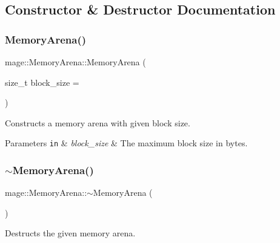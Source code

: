 \subsection{Constructor \& Destructor Documentation}
\hypertarget{classmage_1_1_memory_arena_ac90beb8cf8dc42944a0fd6a4a9e8355c}{}\label{classmage_1_1_memory_arena_ac90beb8cf8dc42944a0fd6a4a9e8355c} 
\subsubsection{\texorpdfstring{Memory\+Arena()}{MemoryArena()}\hspace{0.1cm}{\footnotesize\ttfamily [1/3]}}
{\footnotesize\ttfamily mage\+::\+Memory\+Arena\+::\+Memory\+Arena (\begin{DoxyParamCaption}\item[{size\+\_\+t}]{block\+\_\+size = {} }\end{DoxyParamCaption})}

Constructs a memory arena with given block size.


\begin{DoxyParams}[1]{Parameters}
\mbox{\tt in}  & {\em block\+\_\+size} & The maximum block size in bytes. \\
\hline
\end{DoxyParams}
\hypertarget{classmage_1_1_memory_arena_acfee6fc205e2eaf6aeef4acf19948e6e}{}\label{classmage_1_1_memory_arena_acfee6fc205e2eaf6aeef4acf19948e6e} 
\subsubsection{\texorpdfstring{$\sim$\+Memory\+Arena()}{~MemoryArena()}}
{\footnotesize\ttfamily mage\+::\+Memory\+Arena\+::$\sim$\+Memory\+Arena (\begin{DoxyParamCaption}{ }\end{DoxyParamCaption})\hspace{0.3cm}{\ttfamily [virtual]}}

Destructs the given memory arena. \hypertarget{classmage_1_1_memory_arena_a1eca6fdacbd1226f4b21f443d118168b}{}\label{classmage_1_1_memory_arena_a1eca6fdacbd1226f4b21f443d118168b} 
